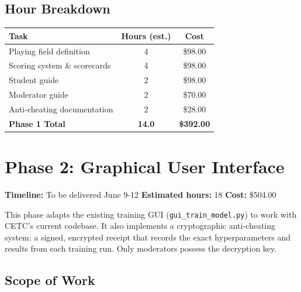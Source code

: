 \documentclass[a4paper]{article}
\begin{document}
\subsection*{Hour Breakdown}

\begin{center}
\begin{tabular}{lcc}
\toprule
\textbf{Task} & \textbf{Hours (est.)} & \textbf{Cost} \\
\midrule
Playing field definition & 4 & \$98.00 \\
Scoring system \& scorecards & 4 & \$98.00 \\
Student guide & 2 & \$98.00 \\
Moderator guide & 2 & \$70.00 \\
Anti-cheating documentation & 2 & \$28.00 \\
\midrule
\textbf{Phase 1 Total} & \textbf{14.0} & \textbf{\$392.00} \\
\bottomrule
\end{tabular}
\end{center}

\section*{Phase 2: Graphical User Interface}

\noindent\textbf{Timeline:} To be delivered June 9-12 \hfill \textbf{Estimated hours:} 18 \hfill \textbf{Cost:} \$504.00

\vspace{0.5em}

This phase adapts the existing training GUI (\texttt{gui\_train\_model.py}) to work with CETC's current codebase. It also implements a cryptographic anti-cheating system: a signed, encrypted receipt that records the exact hyperparameters and results from each training run. Only moderators possess the decryption key.

\subsection*{Scope of Work}
\end{document}
